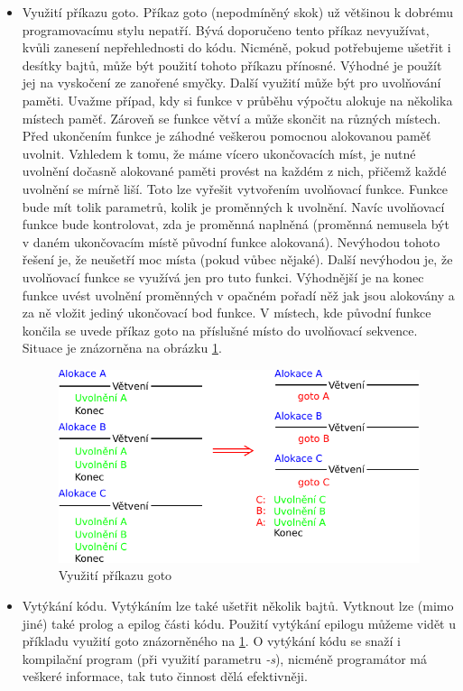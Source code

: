 \begin{itemize}
\item
Využití příkazu goto.
Příkaz goto (nepodmíněný skok) už většinou k dobrému programovacímu stylu nepatří.
Bývá doporučeno tento příkaz nevyužívat, kvůli zanesení nepřehlednosti do kódu.
Nicméně, pokud potřebujeme ušetřit i desítky bajtů, může být použití tohoto příkazu přínosné.
Výhodné je použít jej na vyskočení ze zanořené smyčky.
Další využití může být pro uvolňování paměti.
Uvažme případ, kdy si funkce v průběhu výpočtu alokuje na několika místech paměť.
Zároveň se funkce větví a může skončit na různých místech.
Před ukončením funkce je záhodné veškerou pomocnou alokovanou paměť uvolnit.
Vzhledem k tomu, že máme vícero ukončovacích míst, je nutné uvolnění dočasně alokované paměti provést na každém z nich, přičemž každé uvolnění se mírně liší.
Toto lze vyřešit vytvořením uvolňovací funkce.
Funkce bude mít tolik parametrů, kolik je proměnných k uvolnění.
Navíc uvolňovací funkce bude kontrolovat, zda je proměnná naplněná (proměnná nemusela být v daném ukončovacím místě původní funkce alokovaná).
Nevýhodou tohoto řešení je, že neušetří moc místa (pokud vůbec nějaké).
Další nevýhodou je, že uvolňovací funkce se využívá jen pro tuto funkci.
Výhodnější je na konec funkce uvést uvolnění proměnných v opačném pořadí něž jak jsou alokovány a za ně vložit jediný ukončovací bod funkce.
V místech, kde původní funkce končila se uvede příkaz goto na příslušné místo do uvolňovací sekvence.
Situace je znázorněna na obrázku \ref{fig:goto}.
\begin{figure}[h]
\centering
\includegraphics[width=15cm,keepaspectratio]{obr/goto.pdf}
\caption{Využití příkazu goto}
\label{fig:goto}
\end{figure}

\item
Vytýkání kódu.
Vytýkáním lze také ušetřit několik bajtů.
Vytknout lze (mimo jiné) také prolog a epilog části kódu.
Použití vytýkání epilogu můžeme vidět u příkladu využití goto znázorněného na \ref{fig:goto}.
O vytýkání kódu se snaží i kompilační program (při využití parametru {\it-s}), nicméně programátor má veškeré informace, tak tuto činnost dělá efektivněji.


\end{itemize}
